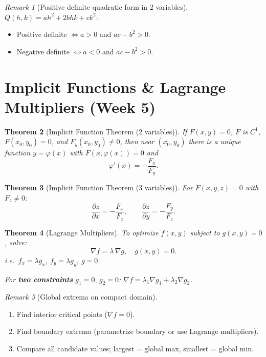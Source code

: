 \documentclass[12pt,a4paper]{article}
\newtheorem{theorem}{Theorem}[section]
\theoremstyle{definition}
\theoremstyle{remark}
\newtheorem{remark}[theorem]{Remark}
\newcommand{\grad}{\nabla}
\newcommand{\pd}[2]{\dfrac{\partial #1}{\partial #2}}
\begin{document}
\begin{remark}[Positive definite quadratic form in 2 variables]
$Q(h,k)=ah^2+2bhk+ck^2$:
\begin{itemize}
  \item Positive definite $\iff a>0$ and $ac-b^2>0$.
  \item Negative definite $\iff a<0$ and $ac-b^2>0$.
\end{itemize}
\end{remark}

\section{Implicit Functions \& Lagrange Multipliers (Week 5)}

\begin{theorem}[Implicit Function Theorem (2 variables)]
If $F(x,y)=0$, $F$ is $C^1$, $F(x_0,y_0)=0$, and $F_y(x_0,y_0)\ne 0$, then near $(x_0,y_0)$
there is a unique function $y=\varphi(x)$ with $F(x,\varphi(x))=0$ and
\[
  \varphi'(x) = -\frac{F_x}{F_y}.
\]
\end{theorem}

\begin{theorem}[Implicit Function Theorem (3 variables)]
For $F(x,y,z)=0$ with $F_z\ne 0$:
\[
  \pd{z}{x} = -\frac{F_x}{F_z},\qquad \pd{z}{y} = -\frac{F_y}{F_z}.
\]
\end{theorem}

\begin{theorem}[Lagrange Multipliers]
To optimize $f(x,y)$ subject to $g(x,y)=0$, solve:
\[
  \grad f = \lambda\,\grad g, \quad g(x,y)=0.
\]
i.e.\ $f_x=\lambda g_x$,\; $f_y=\lambda g_y$,\; $g=0$.

For \textbf{two constraints} $g_1=0,\,g_2=0$:
$\grad f = \lambda_1\grad g_1+\lambda_2\grad g_2$.
\end{theorem}

\begin{remark}[Global extrema on compact domain]
\begin{enumerate}
  \item Find interior critical points ($\grad f=0$).
  \item Find boundary extrema (parametrize boundary or use Lagrange multipliers).
  \item Compare all candidate values; largest = global max, smallest = global min.
\end{enumerate}
\end{remark}
\end{document}
